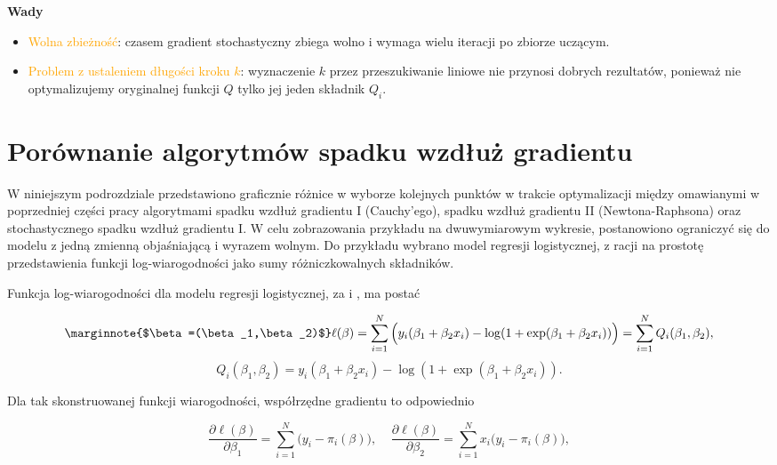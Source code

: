 \textbf{Wady}  \vspace{-5pt}
\begin{itemize}
\item \textcolor{orange}{Wolna zbieżność}: czasem gradient stochastyczny zbiega wolno
i wymaga wielu iteracji po zbiorze uczącym.
\item \textcolor{orange}{Problem z ustaleniem długości kroku $k$}: wyznaczenie $k$
przez przeszukiwanie liniowe nie przynosi dobrych rezultatów,
ponieważ nie optymalizujemy oryginalnej funkcji $Q$ tylko jej jeden
składnik $Q_{i}$.
\end{itemize}
\newpage
\section{Porównanie algorytmów spadku wzdłuż gradientu}

W niniejszym podrozdziale przedstawiono graficznie różnice w wyborze kolejnych punktów w trakcie optymalizacji między omawianymi w poprzedniej części pracy algorytmami spadku wzdłuż gradientu I (Cauchy'ego), spadku wzdłuż gradientu II (Newtona-Raphsona) oraz stochastycznego spadku wzdłuż gradientu I. W celu zobrazowania przykładu na dwuwymiarowym wykresie, postanowiono ograniczyć się do modelu z jedną zmienną objaśniającą i wyrazem wolnym. Do przykładu wybrano model regresji logistycznej, z racji na prostotę przedstawienia funkcji log-wiarogodności jako sumy różniczkowalnych składników.

Funkcja log-wiarogodności dla modelu regresji logistycznej, za \cite{czepiel} i \cite{dobson}, ma postać

\begin{equation}
\marginnote{$\beta=(\beta_1,\beta_2)$}
\ell(\beta) = \sum\limits_{i=1}^{N}\Big(y_i(\beta_1+\beta_2x_i) -\log(1+\exp(\beta_1+\beta_2x_i))\Big) = \sum\limits_{i=1}^{N} Q_i(\beta_1,\beta_2), 
\end{equation}
\begin{equation}
Q_i(\beta_1,\beta_2) = y_i(\beta_1+\beta_2x_i) -\log(1+\exp(\beta_1+\beta_2x_i)).
\end{equation}

Dla tak skonstruowanej funkcji wiarogodności, współrzędne gradientu to odpowiednio

\begin{equation*}
\dfrac{\partial\ell(\beta)}{\partial\beta_1} = \sum\limits_{i=1}^{N}\Big(y_i-\pi_i(\beta)\Big), \ \ \ \ \
\dfrac{\partial\ell(\beta)}{\partial\beta_2} = \sum\limits_{i=1}^{N}x_i\Big(y_i-\pi_i(\beta)\Big),
\end{equation*}

